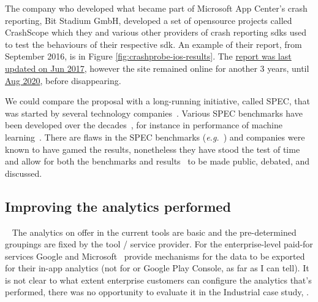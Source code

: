 The company who developed what became part of Microsoft App Center's crash reporting, Bit Stadium GmbH, %
developed a set of opensource projects called CrashScope which they and various other providers of crash reporting \Glspl{sdk} used to test the behaviours of their respective \Gls{sdk}. An example of their report, from  September 2016, is in Figure \ref{fig:crashprobe-ios-results}. The \href{https://github.com/bitstadium/crashprobe.github.com/commit/30844b9794f7cfd48f35d043f255b58f1f70e7e6}{report was last updated on  Jun 2017}, however the site remained online for another 3 years, until \href{https://github.com/bitstadium/crashprobe.github.com/commit/4398b88e263d222ed4d55e1dce59d67de11bfaaa}{ Aug 2020}, before disappearing. 
% 

We could compare the proposal with a long-running initiative, called SPEC, that was started by several technology companies~. Various SPEC benchmarks have been developed over the decades~, for instance in performance of machine learning~. There are flaws in the SPEC benchmarks (\emph{e.g.}~) and companies were known to have gamed the results, nonetheless they have stood the test of time and allow for both the benchmarks and results~ to be made public, debated, and discussed.

\subsection{Improving the analytics performed}~\label{tats-improving-the-analytics-performed}
The analytics on offer in the current tools are basic and the pre-determined groupings are fixed by the tool / service provider. For the enterprise-level paid-for services Google and Microsoft~ provide mechanisms for the data to be exported for their in-app analytics (not for  or Google Play Console, as far as I can tell). It is not clear to what extent enterprise customers can configure the analytics that's performed, there was no opportunity to evaluate it in the Industrial case study, .

